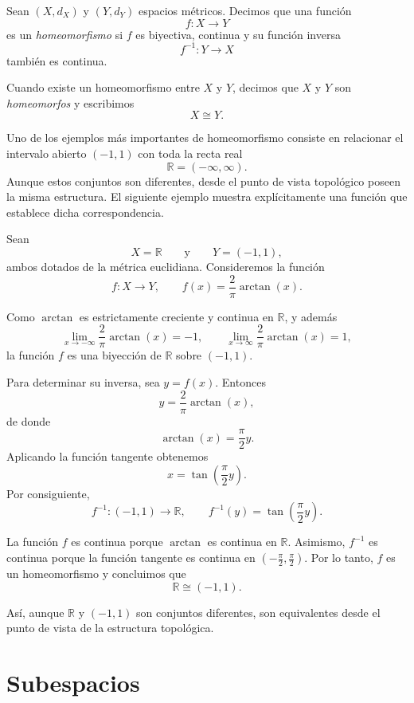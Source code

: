 \begin{definition}
Sean $(X,d_X)$ y $(Y,d_Y)$ espacios métricos. Decimos que una función
\[
f\colon X\to Y
\]
es un \emph{homeomorfismo} si $f$ es biyectiva, continua y su función
inversa
\[
f^{-1}\colon Y\to X
\]
también es continua.

Cuando existe un homeomorfismo entre $X$ y $Y$, decimos que $X$ y $Y$
son \emph{homeomorfos} y escribimos
\[
X\cong Y.
\]
\end{definition}

Uno de los ejemplos más importantes de homeomorfismo consiste en
relacionar el intervalo abierto $(-1,1)$ con toda la recta real
\[
\mathbb{R}=(-\infty,\infty).
\]
Aunque estos conjuntos son diferentes, desde el punto de vista
topológico poseen la misma estructura. El siguiente ejemplo muestra
explícitamente una función que establece dicha correspondencia.

\begin{example}
Sean
\[
X=\mathbb{R}
\qquad\text{y}\qquad
Y=(-1,1),
\]
ambos dotados de la métrica euclidiana. Consideremos la función
\[
f\colon X\to Y,
\qquad
f(x)=\frac{2}{\pi}\arctan(x).
\]

Como $\arctan$ es estrictamente creciente y continua en $\mathbb{R}$,
y además
\[
\lim_{x\to-\infty}\frac{2}{\pi}\arctan(x)=-1,
\qquad
\lim_{x\to\infty}\frac{2}{\pi}\arctan(x)=1,
\]
la función $f$ es una biyección de $\mathbb{R}$ sobre $(-1,1)$.

Para determinar su inversa, sea $y=f(x)$. Entonces
\[
y=\frac{2}{\pi}\arctan(x),
\]
de donde
\[
\arctan(x)=\frac{\pi}{2}y.
\]
Aplicando la función tangente obtenemos
\[
x=\tan\left(\frac{\pi}{2}y\right).
\]
Por consiguiente,
\[
f^{-1}\colon (-1,1)\to\mathbb{R},
\qquad
f^{-1}(y)=\tan\left(\frac{\pi}{2}y\right).
\]

La función $f$ es continua porque $\arctan$ es continua en
$\mathbb{R}$. Asimismo, $f^{-1}$ es continua porque la función
tangente es continua en
$\left(-\frac{\pi}{2},\frac{\pi}{2}\right)$. Por lo tanto, $f$ es un
homeomorfismo y concluimos que
\[
\mathbb{R}\cong(-1,1).
\]

Así, aunque $\mathbb{R}$ y $(-1,1)$ son conjuntos diferentes, son
equivalentes desde el punto de vista de la estructura topológica.
\end{example}

\section{Subespacios}

